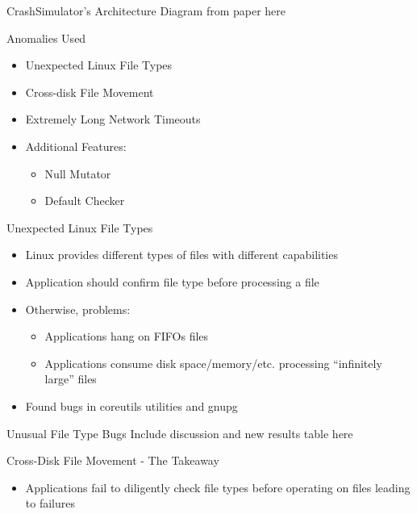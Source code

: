 \documentclass[pdf]{beamer}
\begin{document}
\begin{frame}{CrashSimulator's Architecture}
    Diagram from paper here
\end{frame}


\begin{frame}{Anomalies Used}
  \begin{itemize}
  \item{Unexpected Linux File Types}
  \item{Cross-disk File Movement}
  \item{Extremely Long Network Timeouts}
  \item{Additional Features:}
    \begin{itemize}
    \item{Null Mutator}
    \item{Default Checker}
    \end{itemize}
  \end{itemize}
\end{frame}


\begin{frame}{Unexpected Linux File Types}
  \begin{itemize}
  \item{Linux provides different types of files with different capabilities}
  \item{Application should confirm file type before processing a file}
  \item{Otherwise, problems:}
    \begin{itemize}
    \item{Applications hang on FIFOs files}
    \item{Applications consume disk space/memory/etc. processing ``infinitely
        large'' files}
    \end{itemize}
  \item{Found bugs in coreutils utilities and gnupg}
  \end{itemize}
\end{frame}


\begin{frame}{Unusual File Type Bugs}
  Include discussion and new results table here
\end{frame}


\begin{frame}{Cross-Disk File Movement - The Takeaway}
  \begin{itemize}
    \item{Applications fail to diligently check file types before operating
      on files leading to failures}
  \end{itemize}
\end{frame}
\end{document}
